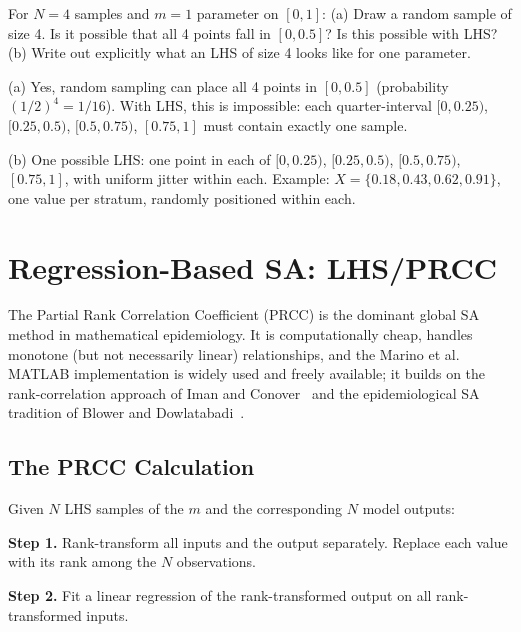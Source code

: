 \begin{selfcheck}
For $N = 4$ samples and $m = 1$ parameter on $[0, 1]$:
(a) Draw a random sample of size 4. Is it possible that all 4 points
    fall in $[0, 0.5]$? Is this possible with LHS?
(b) Write out explicitly what an LHS of size 4 looks like for one parameter.
\end{selfcheck}
\begin{scAnswer}
(a) Yes, random sampling can place all 4 points in $[0, 0.5]$ (probability $(1/2)^4 = 1/16$).
With LHS, this is impossible: each quarter-interval $[0,0.25)$, $[0.25,0.5)$,
$[0.5,0.75)$, $[0.75,1]$ must contain exactly one sample.

(b) One possible LHS: one point in each of $[0,0.25)$, $[0.25,0.5)$,
$[0.5,0.75)$, $[0.75,1]$, with uniform jitter within each. Example:
$X = \{0.18, 0.43, 0.62, 0.91\}$, one value per stratum,
randomly positioned within each.
\end{scAnswer}

\section{Regression-Based SA: LHS/PRCC}
\label{sec:prcc}

The Partial Rank Correlation Coefficient (PRCC) is the dominant
global SA method in mathematical epidemiology.
It is computationally cheap, handles monotone (but not necessarily linear)
relationships, and the Marino et al.~\cite{marino2008methodology} MATLAB implementation
is widely used and freely available; it builds on the rank-correlation
approach of Iman and Conover~\cite{iman1982distribution} and the
epidemiological SA tradition of Blower and Dowlatabadi~\cite{blower1994sensitivity}.

\subsection{The PRCC Calculation}

Given $N$ LHS samples of the $m$ \POIs and the corresponding $N$
model outputs:

\textbf{Step 1.} Rank-transform all inputs and the output separately.
Replace each value with its rank among the $N$ observations.

\textbf{Step 2.} Fit a linear regression of the rank-transformed output
on all rank-transformed inputs.

